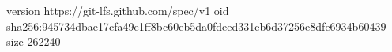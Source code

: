 version https://git-lfs.github.com/spec/v1
oid sha256:945734dbae17cfa49e1ff8bc60eb5da0fdeed331eb6d37256e8dfe6934b60439
size 262240
